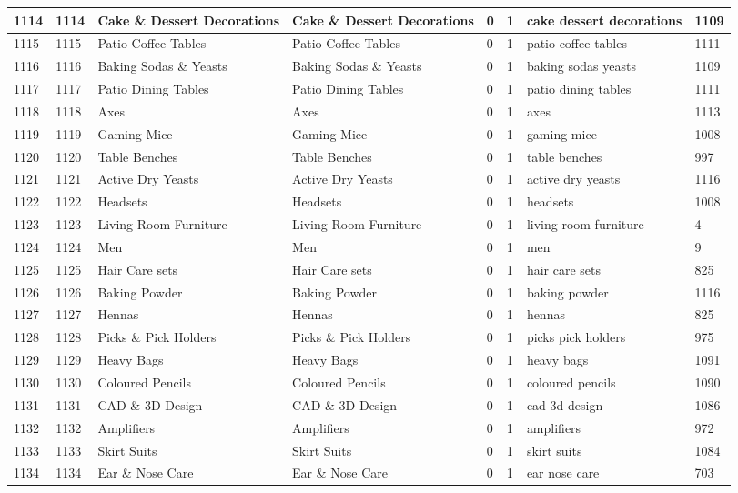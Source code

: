 \begin{longtable}{|l|l|l|l|l|l|l|l|}
1114 & 1114 & Cake \& Dessert Decorations & Cake \& Dessert Decorations & 0 & 1 & cake dessert decorations & 1109 \\ \hline 
1115 & 1115 & Patio Coffee Tables & Patio Coffee Tables & 0 & 1 & patio coffee tables & 1111 \\ \hline 
1116 & 1116 & Baking Sodas \& Yeasts & Baking Sodas \& Yeasts & 0 & 1 & baking sodas yeasts & 1109 \\ \hline 
1117 & 1117 & Patio Dining Tables & Patio Dining Tables & 0 & 1 & patio dining tables & 1111 \\ \hline 
1118 & 1118 & Axes & Axes & 0 & 1 & axes & 1113 \\ \hline 
1119 & 1119 & Gaming Mice & Gaming Mice & 0 & 1 & gaming mice & 1008 \\ \hline 
1120 & 1120 & Table Benches & Table Benches & 0 & 1 & table benches & 997 \\ \hline 
1121 & 1121 & Active Dry Yeasts & Active Dry Yeasts & 0 & 1 & active dry yeasts & 1116 \\ \hline 
1122 & 1122 & Headsets & Headsets & 0 & 1 & headsets & 1008 \\ \hline 
1123 & 1123 & Living Room Furniture & Living Room Furniture & 0 & 1 & living room furniture & 4 \\ \hline 
1124 & 1124 & Men & Men & 0 & 1 & men & 9 \\ \hline 
1125 & 1125 & Hair Care sets & Hair Care sets & 0 & 1 & hair care sets & 825 \\ \hline 
1126 & 1126 & Baking Powder & Baking Powder & 0 & 1 & baking powder & 1116 \\ \hline 
1127 & 1127 & Hennas & Hennas & 0 & 1 & hennas & 825 \\ \hline 
1128 & 1128 & Picks \& Pick Holders & Picks \& Pick Holders & 0 & 1 & picks pick holders & 975 \\ \hline 
1129 & 1129 & Heavy Bags & Heavy Bags & 0 & 1 & heavy bags & 1091 \\ \hline 
1130 & 1130 & Coloured Pencils & Coloured Pencils & 0 & 1 & coloured pencils & 1090 \\ \hline 
1131 & 1131 & CAD \& 3D Design & CAD \& 3D Design & 0 & 1 & cad 3d design & 1086 \\ \hline 
1132 & 1132 & Amplifiers & Amplifiers & 0 & 1 & amplifiers & 972 \\ \hline 
1133 & 1133 & Skirt Suits & Skirt Suits & 0 & 1 & skirt suits & 1084 \\ \hline 
1134 & 1134 & Ear \& Nose Care & Ear \& Nose Care & 0 & 1 & ear nose care & 703 \\ \hline 

\end{longtable}
